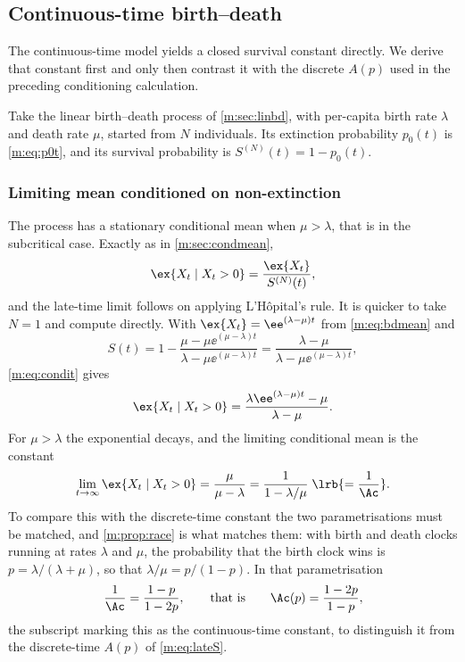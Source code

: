 \subsection{Continuous-time birth--death}
\label{m:sec:cts}

The continuous-time model yields a closed survival constant directly.  We derive
that constant first and only then contrast it with the discrete $A(p)$ used in the
preceding conditioning calculation.

Take the linear birth--death process of \cref{m:sec:linbd}, with per-capita birth
rate $\lambda$ and death rate $\mu$, started from $N$ individuals. Its extinction
probability $p_0(t)$ is \cref{m:eq:p0t}, and its survival probability is
$S^{(N)}(t) = 1-p_0(t)$.

\subsubsection*{Limiting mean conditioned on non-extinction}

The process has a stationary conditional mean when $\mu>\lambda$, that is in the
subcritical case. Exactly as in \cref{m:sec:condmean},
\begin{equation}
\label{m:eq:condit}
\ex{X_t\mid X_t>0} = \frac{\ex{X_t}}{S^{(N)}(t)},
\end{equation}
and the late-time limit follows on applying L'Hôpital's rule. It is quicker to take
$N=1$ and compute directly. With $\ex{X_t}=\ee^{(\lambda-\mu)t}$ from
\cref{m:eq:bdmean} and
\begin{equation*}
S(t) = 1-\frac{\mu-\mu\ee^{(\mu-\lambda)t}}{\lambda-\mu\ee^{(\mu-\lambda)t}}
= \frac{\lambda-\mu}{\lambda-\mu\ee^{(\mu-\lambda)t}},
\end{equation*}
\cref{m:eq:condit} gives
\begin{equation*}
\ex{X_t\mid X_t>0} = \frac{\lambda\ee^{(\lambda-\mu)t}-\mu}{\lambda-\mu} .
\end{equation*}
For $\mu>\lambda$ the exponential decays, and the limiting conditional mean is the
constant
\begin{equation}
\label{m:eq:ctsqsmean}
\lim_{t\to\infty}\ex{X_t\mid X_t>0} = \frac{\mu}{\mu-\lambda}
= \frac{1}{1-\lambda/\mu}
\;\lrb{=\frac{1}{\Ac}} .
\end{equation}
To compare this with the discrete-time constant the two parametrisations must be
matched, and \cref{m:prop:race} is what matches them: with birth and death clocks
running at rates $\lambda$ and $\mu$, the probability that the birth clock wins is
$p = \lambda/(\lambda+\mu)$, so that $\lambda/\mu = p/(1-p)$. In that
parametrisation
\begin{equation}
\label{m:eq:Acts}
\frac{1}{\Ac} = \frac{1-p}{1-2p},
\qquad\text{that is}\qquad
\Ac(p) = \frac{1-2p}{1-p} ,
\end{equation}
the subscript marking this as the continuous-time constant, to distinguish it from
the discrete-time $A(p)$ of \cref{m:eq:lateS}.


